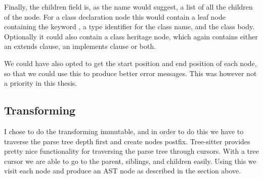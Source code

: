 Finally, the children field is, as the name would suggest, a list of all the children of the node.
For a class declaration node this would contain a leaf node containing the keyword , a type identifier for the class name, and the class body.
Optionally it could also contain a class heritage node, which again contains either an extends clause, an implements clause or both.

We could have also opted to get the start position and end position of each node, so that we could use this to produce better error messages.
This was however not a priority in this thesis.

\subsection{Transforming}\label{subsec:transforming}

I chose to do the transforming immutable, and in order to do this we have to traverse the parse tree depth first and create nodes postfix.
Tree-sitter provides pretty nice functionality for traversing the parse tree through cursors.
With a tree cursor we are able to go to the parent, siblings, and children easily.
Using this we visit each node and produce an AST node as described in the section above.